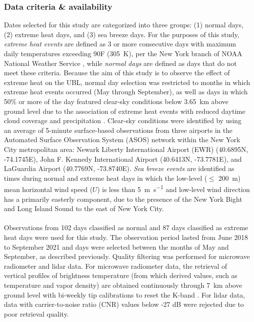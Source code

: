 \documentclass[11pt,a4paper]{article}
\begin{document}
\subsubsection{Data criteria \& availability}
Dates selected for this study are categorized into three groups: (1) normal days, (2) extreme heat days, and (3) sea breeze days. For the purposes of this study, \textit{extreme heat events} are defined as 3 or more consecutive days with maximum daily temperatures exceeding 90\textdegree F (\SI{305}{\kelvin}), per the New York branch of NOAA National Weather Service \citep{robinson2001, nws2018}, while \textit{normal days} are defined as days that do not meet these criteria. Because the aim of this study is to observe the effect of extreme heat on the UBL, normal day selection was restricted to months in which extreme heat events occurred (May through September), as well as days in which 50\% or more of the day featured clear-sky conditions below \SI{3.65}{\kilo\meter} above ground level due to the association of extreme heat events with reduced daytime cloud coverage and precipitation \citep{stefanon2014, thomas2020}. Clear-sky conditions were identified by using an average of 5-minute surface-based observations from three airports in the Automated Surface Observation System (ASOS) \citep{asos1998} network within the New York City metropolitan area: Newark Liberty International Airport (EWR) (40.6895\textdegree N, -74.1745\textdegree E), John F. Kennedy International Airport (40.6413\textdegree N, -73.7781\textdegree E), and LaGuardia Airport (40.7769\textdegree N, -73.8740\textdegree E). \textit{Sea breeze events} are identified as times during normal and extreme heat days in which the low-level ($\leq$ \SI{200}{\meter}) mean horizontal wind speed ($U$) is less than \SI{5}{\meter\per\second} and low-level wind direction has a primarily easterly component, due to the presence of the New York Bight and Long Island Sound to the east of New York City.
\\ \\
Observations from 102 days classified as normal and 87 days classified as extreme heat days were used for this study. The observation period lasted from June 2018 to September 2021 and days were selected between the months of May and September, as described previously. Quality filtering was performed for microwave radiometer and lidar data. For microwave radiometer data, the retrieval of vertical profiles of brightness temperature (from which derived values, such as temperature and vapor density) are obtained continuously through \SI{7}{\kilo\meter} above ground level with bi-weekly tip calibrations to reset the K-band \citep{shrestha2021}.  For lidar data, data with carrier-to-noise ratio (CNR) values below -27 dB were rejected \citep{kumer2014, shrestha2021} due to poor retrieval quality. 
\end{document}
